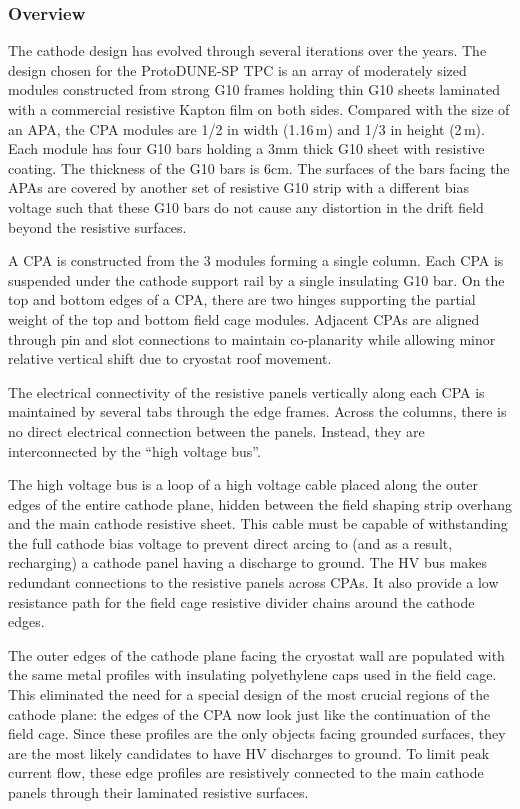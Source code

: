 \subsubsection{Overview}

The cathode design has evolved through several iterations over the years.  The design chosen for the ProtoDUNE-SP TPC is an array of moderately sized modules constructed from strong G10 frames holding thin G10 sheets laminated with a commercial resistive Kapton film on both sides.   Compared with the size of an APA, the CPA modules are 1/2 in width (1.16\,m) and 1/3 in height (2\,m).   Each module has four G10 bars holding a 3mm thick G10 sheet with resistive coating.  The thickness of the G10 bars is 6cm.  The surfaces of the bars facing the APAs are covered by another set of resistive G10 strip with a different bias voltage such that these G10 bars do not cause any distortion in the drift field beyond the resistive surfaces.

A CPA is constructed from the 3 modules forming a single column.  Each CPA is suspended under the cathode support rail by a single insulating G10 bar.  On the top and bottom edges of a CPA, there are two hinges supporting the partial weight of the top and bottom field cage modules.   Adjacent CPAs are aligned through pin and slot connections to maintain co-planarity while allowing minor relative vertical shift due to cryostat roof movement.

The electrical connectivity of the resistive panels vertically along each CPA is maintained by several tabs through the edge frames.  Across the columns, there is no direct electrical connection between the panels.  Instead, they are interconnected by the ``high voltage bus''. 

The high voltage bus is a loop of a high voltage cable placed along the outer edges of the entire cathode plane, hidden between the field shaping strip overhang and the main cathode resistive sheet.  This cable must be capable of withstanding the full cathode bias voltage to prevent direct arcing to (and as a result, recharging) a cathode panel having a discharge to ground. The HV bus makes redundant connections to the resistive panels across CPAs.  It also provide a low resistance path for the field cage resistive divider chains around the cathode edges.

The outer edges of the cathode plane facing the cryostat wall are populated with the same metal profiles with insulating polyethylene caps used in the field cage.  This eliminated the need for a special design of the most crucial regions of the cathode plane: the edges of the CPA now look just like the continuation of the field cage.  Since these profiles are the only objects facing grounded surfaces, they are the most likely candidates to have HV discharges to ground.   To limit peak current flow, these edge profiles are resistively connected to the main cathode panels through their laminated resistive surfaces.  


